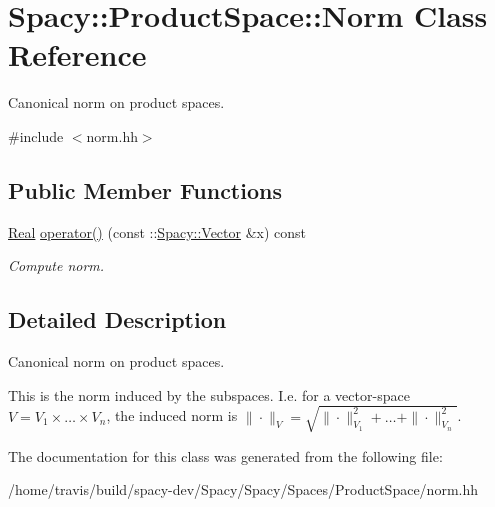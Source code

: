 \hypertarget{classSpacy_1_1ProductSpace_1_1Norm}{\section{Spacy\-:\-:Product\-Space\-:\-:Norm Class Reference}
\label{classSpacy_1_1ProductSpace_1_1Norm}
}


Canonical norm on product spaces.  




{\ttfamily \#include $<$norm.\-hh$>$}

\subsection*{Public Member Functions}
\begin{DoxyCompactItemize}
\item 
\hypertarget{classSpacy_1_1ProductSpace_1_1Norm_a2c5b998ea93fdfb5e3c0df5f436bbe05}{\hyperlink{classSpacy_1_1Real}{Real} \hyperlink{classSpacy_1_1ProductSpace_1_1Norm_a2c5b998ea93fdfb5e3c0df5f436bbe05}{operator()} (const \-::\hyperlink{classSpacy_1_1Vector}{Spacy\-::\-Vector} \&x) const }\label{classSpacy_1_1ProductSpace_1_1Norm_a2c5b998ea93fdfb5e3c0df5f436bbe05}

\begin{DoxyCompactList}\small\item\em Compute norm. \end{DoxyCompactList}\end{DoxyCompactItemize}


\subsection{Detailed Description}
Canonical norm on product spaces. 

This is the norm induced by the subspaces. I.\-e. for a vector-\/space $V=V_1 \times \ldots \times V_n $, the induced norm is $\|\cdot\|_V=\sqrt{\|\cdot\|^2_{V_1} + \ldots + \|\cdot\|^2_{V_n}}$. 

The documentation for this class was generated from the following file\-:\begin{DoxyCompactItemize}
\item 
/home/travis/build/spacy-\/dev/\-Spacy/\-Spacy/\-Spaces/\-Product\-Space/norm.\-hh\end{DoxyCompactItemize}
